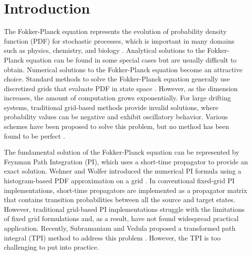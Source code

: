\documentclass[aps,pre,reprint,superscriptaddress,showpacs,amsmath
,floatfix
]{revtex4-2}
\begin{document}

\maketitle


\section{Introduction}
The Fokker-Planck equation represents the evolution of probability density function (PDF) for stochastic processes, which is important in many domains such as physics, chemistry, and biology \cite{risken1996fokker, frank2005nonlinear}. Analytical solutions to the Fokker-Planck equation can be found in some special cases but are usually difficult to obtain.  Numerical solutions to the Fokker-Planck equation become an attractive choice. Standard methods to solve the Fokker-Planck equation generally use discretized grids that evaluate PDF in state space \cite{challa2000nonlinear}. However, as the dimension increases, the amount of computation grows exponentially. For large drifting systems, traditional grid-based methods provide invalid solutions, where probability values can be negative and exhibit oscillatory behavior. Various schemes have been proposed to solve this problem, but no method has been found to be perfect \cite{xu2009quadrature, moore2022adaptive}.

The fundamental solution of the Fokker-Planck equation can be represented by Feynman Path Integration (PI), which uses a short-time propagator to provide an exact solution. Wehner and Wolfer introduced the numerical PI formula using a histogram-based PDF approximation on a grid \cite{wehner1983numerical}. In conventional fixed-grid PI implementations, short-time propagators are implemented as a propagator matrix that contains transition probabilities between all the source and target states. However, traditional grid-based PI implementations struggle with the limitations of fixed grid formulations and, as a result, have not found widespread practical application. Recently, Subramaniam and Vedula proposed a transformed path integral (TPI) method to address this problem \cite{subramaniam2017transformed}. However, the TPI is too challenging to put into practice. 
\end{document}
